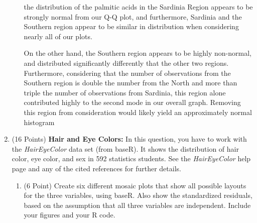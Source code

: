 \documentclass[12pt,letterpaper,final]{article}
\begin{document}
\begin{enumerate}
\begin{enumerate}
the distribution of the palmitic acids in the Sardinia Region appears to be strongly normal from our Q-Q plot, and furthermore, Sardinia and the Southern region appear to be similar in distribution when considering nearly all of our plots.

On the other hand, the Southern region appears to be highly non-normal, and distributed significantly differently that the other two regions.  Furthermore, considering that the number of observations from the Southern region is double the number from the North and more than triple the number of observations from Sardinia, this region alone contributed highly to the second mode in our overall graph.  Removing this region from consideration would likely yield an approximately normal histogram

\end{enumerate}



\newpage


\item (16 Points) {\bf Hair and Eye Colors:}
In this question, you have to work with the {\it HairEyeColor} data set (from  baseR).
It shows the distribution of hair color, eye color, and sex in 592 statistics students.
See the {\it HairEyeColor} help page and 
any of the cited references
for further details.

\begin{enumerate}
\item (6 Point) Create six different mosaic plots that show all possible
layouts for the three variables, using baseR. Also show the standardized residuals,
based on the assumption that all three variables are independent.
Include your figures and your R code. \\


\end{enumerate}
\end{enumerate}
\end{document}
